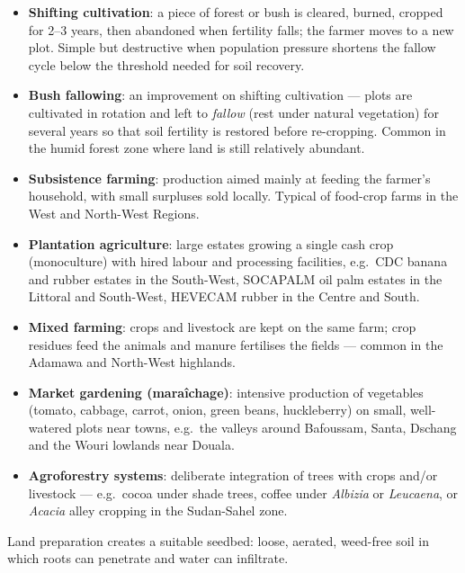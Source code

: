 \documentclass[11pt]{article}
\newcommand{\cle}[1]{{\popxbold\color{popdark}#1}}
\newcounter{popsec}
\newcounter{popsub}
\newcommand{\courssub}[1]{%
  \stepcounter{popsub}%
  \par\vspace{9pt}\noindent{\popxbold\fontsize{11.5}{13}\selectfont\color{popink}{\color{poporange}\thepopsec.\thepopsub}\hspace{6pt}#1}\par\nopagebreak\vspace{4pt}
}
\begin{document}
\begin{itemize}
\item \textbf{Shifting cultivation}: a piece of forest or bush is cleared, burned, cropped for 2--3 years, then abandoned when fertility falls; the farmer moves to a new plot. Simple but destructive when population pressure shortens the fallow cycle below the threshold needed for soil recovery.
\item \textbf{Bush fallowing}: an improvement on shifting cultivation — plots are cultivated in rotation and left to \emph{fallow} (rest under natural vegetation) for several years so that soil fertility is restored before re-cropping. Common in the humid forest zone where land is still relatively abundant.
\item \textbf{Subsistence farming}: production aimed mainly at feeding the farmer's household, with small surpluses sold locally. Typical of food-crop farms in the West and North-West Regions.
\item \textbf{Plantation agriculture}: large estates growing a single cash crop (monoculture) with hired labour and processing facilities, e.g.\ CDC banana and rubber estates in the South-West, SOCAPALM oil palm estates in the Littoral and South-West, HEVECAM rubber in the Centre and South.
\item \textbf{Mixed farming}: crops and livestock are kept on the same farm; crop residues feed the animals and manure fertilises the fields — common in the Adamawa and North-West highlands.
\item \textbf{Market gardening (maraîchage)}: intensive production of vegetables (tomato, cabbage, carrot, onion, green beans, huckleberry) on small, well-watered plots near towns, e.g.\ the valleys around Bafoussam, Santa, Dschang and the Wouri lowlands near Douala.
\item \textbf{Agroforestry systems}: deliberate integration of trees with crops and/or livestock — e.g.\ cocoa under shade trees, coffee under \emph{Albizia} or \emph{Leucaena}, or \emph{Acacia} alley cropping in the Sudan-Sahel zone.
\end{itemize}

\courssub{Land Preparation}

Land preparation creates a suitable \cle{seedbed}: loose, aerated, weed-free soil in which roots can penetrate and water can infiltrate.
\end{document}
